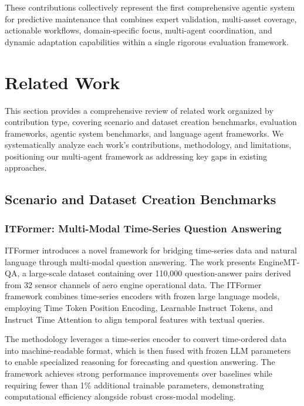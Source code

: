 \documentclass[conference]{IEEEtran}
\begin{document}
These contributions collectively represent the first comprehensive agentic system for predictive maintenance that combines expert validation, multi-asset coverage, actionable workflows, domain-specific focus, multi-agent coordination, and dynamic adaptation capabilities within a single rigorous evaluation framework.

\section{Related Work}

This section provides a comprehensive review of related work organized by contribution type, covering scenario and dataset creation benchmarks, evaluation frameworks, agentic system benchmarks, and language agent frameworks. We systematically analyze each work's contributions, methodology, and limitations, positioning our multi-agent framework as addressing key gaps in existing approaches.

\subsection{Scenario and Dataset Creation Benchmarks}

\subsubsection{ITFormer: Multi-Modal Time-Series Question Answering}

ITFormer \cite{lei2024itformer} introduces a novel framework for bridging time-series data and natural language through multi-modal question answering. The work presents EngineMT-QA, a large-scale dataset containing over 110,000 question-answer pairs derived from 32 sensor channels of aero engine operational data. The ITFormer framework combines time-series encoders with frozen large language models, employing Time Token Position Encoding, Learnable Instruct Tokens, and Instruct Time Attention to align temporal features with textual queries.

The methodology leverages a time-series encoder to convert time-ordered data into machine-readable format, which is then fused with frozen LLM parameters to enable specialized reasoning for forecasting and question answering. The framework achieves strong performance improvements over baselines while requiring fewer than 1\% additional trainable parameters, demonstrating computational efficiency alongside robust cross-modal modeling.
\end{document}

